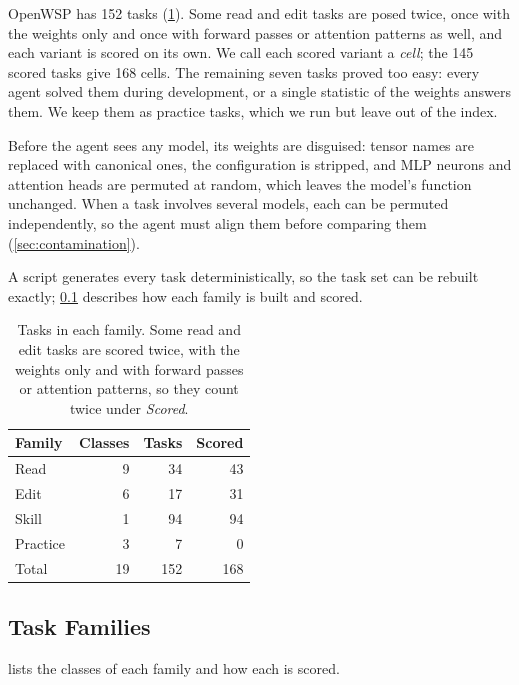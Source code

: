 \documentclass[11pt]{article}
\newcommand{\bench}{OpenWSP\xspace}
\begin{document}
\bench has 152 tasks (\cref{tab:composition}). Some read and edit tasks are
posed twice, once with the weights only and once with forward passes or attention patterns as
well, and each variant is scored on its own. We call each scored variant a \emph{cell}; the 145
scored tasks give 168 cells. The remaining seven tasks proved too easy: every agent solved them
during development, or a single statistic of the weights answers them. We keep them as practice
tasks, which we run but leave out of the index.

Before the agent sees any model, its weights are disguised: tensor names are replaced with
canonical ones, the configuration is stripped, and MLP neurons and attention heads are
permuted at random, which leaves the model's function unchanged. When a task involves several
models, each can be permuted independently, so the agent must align them before comparing
them (\cref{sec:contamination}).

A script generates every task deterministically, so the task set can be rebuilt exactly;
\cref{sec:tasks} describes how each family is built and scored.

\begin{table}[t]
  \centering
  \caption{Tasks in each family. Some read and edit tasks are scored twice, with the weights
  only and with forward passes or attention patterns, so they count twice under
  \emph{Scored}.}
  \label{tab:composition}
  \begin{tabular}{lrrr}
    \toprule
    Family & Classes & Tasks & Scored \\
    \midrule
    Read     &  9 &  34 &  43 \\
    Edit     &  6 &  17 &  31 \\
    Skill    &  1 &  94 &  94 \\
    Practice &  3 &   7 &   0 \\
    \midrule
    Total    & 19 & 152 & 168 \\
    \bottomrule
  \end{tabular}
\end{table}

\subsection{Task Families}\label{sec:tasks}

 lists the classes of each family and how each is scored.
\end{document}
